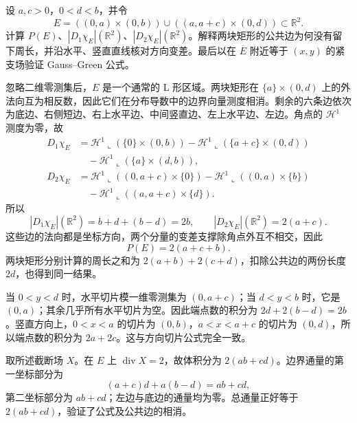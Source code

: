 \begin{exercise}\label{g3:ex:adjacent-rectangle-perimeter}
	设 \(a,c>0\)，\(0<d<b\)，并令
	\[
		E=((0,a)\times(0,b))\cup((a,a+c)\times(0,d))\subset\mathbb R^2.
	\]
	计算 \(P(E)\)、\(|D_1\chi_E|(\mathbb R^2)\)、\(|D_2\chi_E|(\mathbb R^2)\)。解释两块矩形的公共边为何没有留下周长，并沿水平、竖直直线核对方向变差。最后以在 \(\overline E\) 附近等于 \((x,y)\) 的紧支场验证 Gauss--Green 公式。
\end{exercise}
\begin{solution}
	忽略二维零测集后，\(E\) 是一个通常的 L 形区域。两块矩形在 \(\{a\}\times(0,d)\) 上的外法向互为相反数，因此它们在分布导数中的边界向量测度相消。剩余的六条边依次为底边、右侧短边、右上水平边、中间竖直边、左上水平边、左边。角点的 \(\mathcal H^1\) 测度为零，故
	\[
	\begin{aligned}
		D_1\chi_E
		&=\mathcal H^1\!\llcorner(\{0\}\times(0,b))
		-\mathcal H^1\!\llcorner(\{a+c\}\times(0,d))\\
		&\quad-\mathcal H^1\!\llcorner(\{a\}\times(d,b)),\\
		D_2\chi_E
		&=\mathcal H^1\!\llcorner((0,a+c)\times\{0\})
		-\mathcal H^1\!\llcorner((0,a)\times\{b\})\\
		&\quad-\mathcal H^1\!\llcorner((a,a+c)\times\{d\}).
	\end{aligned}
	\]
	所以
	\[
		|D_1\chi_E|(\mathbb R^2)=b+d+(b-d)=2b,
		\qquad |D_2\chi_E|(\mathbb R^2)=2(a+c).
	\]
	这些边的法向都是坐标方向，两个分量的变差支撑除角点外互不相交，因此
	\[
		P(E)=2(a+c+b).
	\]
	两块矩形分别计算的周长之和为 \(2(a+b)+2(c+d)\)，扣除公共边的两份长度 \(2d\)，也得到同一结果。

	当 \(0<y<d\) 时，水平切片模一维零测集为 \((0,a+c)\)；当 \(d<y<b\) 时，它是 \((0,a)\)；其余几乎所有水平切片为空。因此端点数的积分为 \(2d+2(b-d)=2b\)。竖直方向上，\(0<x<a\) 的切片为 \((0,b)\)，\(a<x<a+c\) 的切片为 \((0,d)\)，所以端点数的积分为 \(2a+2c\)。这与方向切片公式完全一致。

	取所述截断场 \(X\)。在 \(E\) 上 \(\operatorname{div}X=2\)，故体积分为 \(2(ab+cd)\)。边界通量的第一坐标部分为
	\[
		(a+c)d+a(b-d)=ab+cd,
	\]
	第二坐标部分为 \(ab+cd\)；左边与底边的通量均为零。总通量正好等于 \(2(ab+cd)\)，验证了公式及公共边的相消。
\end{solution}

